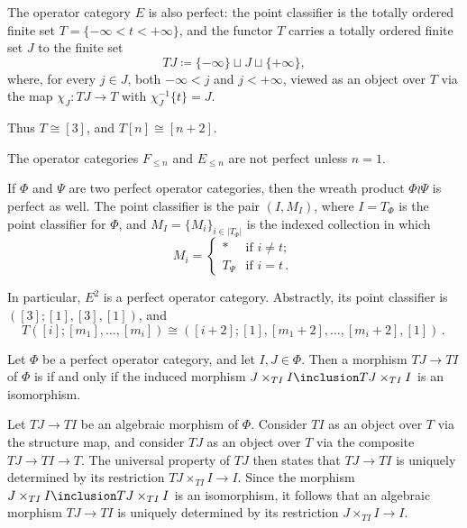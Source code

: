 \begin{eg}
	The operator category $ E $ is also perfect:
	the point classifier is the totally ordered finite set
	$ T = \{ -\infty < t < +\infty \} $,
	and the functor $ T $ carries a totally ordered finite set $ J $
	to the finite set
	\[ TJ \coloneq \{ -\infty \} \sqcup J \sqcup \{ +\infty \} \comma \]
	where, for every $ j \in J $, both $ -\infty < j $ and $ j < +\infty $,
	viewed as an object over $ T $ via the map
	$ \chi_J \colon TJ \to T $ with $ \chi_J^{-1}\{t\} = J $.

	Thus $ T \cong [3] $, and
	$ T[n] \cong [n+2] $.
\end{eg}

\begin{eg}
	The operator categories $ F_{\leq n} $ and $ E_{\leq n} $ are
	not perfect unless $ n = 1 $.
\end{eg}

\begin{eg}
	If $ \Phi $ and $ \Psi $ are two perfect operator categories,
	then the wreath product $ \Phi \wr \Psi $ is perfect as well.
	The point classifier is the pair $ (I, M_I) $, where
	$ I = T_{\Phi} $ is the point classifier for $ \Phi $, and
	$ M_I = \{M_i\}_{i \in |T_{\Phi}|} $ is the indexed collection in which
	\[
		M_i = \begin{cases}
			\ast & \text{if } i \neq t \semicolon \\
			T_{\Psi} & \text{if } i = t \period
		\end{cases}
	\]
\end{eg}

\begin{eg}
	In particular, $ E^2 $ is a perfect operator category.
	Abstractly, its point classifier is $ ([3]; [1], [3], [1])$, and
	\[ T([i]; [m_1], \dots, [m_i]) \cong ([i+2]; [1], [m_1+2], \dots, [m_i+2], [1]) \period \]
\end{eg}

\begin{definition}
	Let $ \Phi $ be a perfect operator category, and
	let $ I, J \in \Phi $.
	Then a morphism $ TJ \to TI $ of $ \Phi $
	is  if and only if 
	the induced morphism $ J \times_{TI} I \inclusion TJ \times_{TI} I $
	is an isomorphism.
\end{definition}

\begin{nul}
	Let $ TJ \to TI $ be an algebraic morphism of $ \Phi $.
	Consider $ TI $ as an object over $ T $ via
	the structure map, and
	consider $ TJ $ as an object over $ T $ via
	the composite $ TJ \to TI \to T $.
	The universal property of $ TJ $ then states that
	$ TJ \to TI $ is uniquely determined by its restriction
	$ TJ \times_{TI} I \to I $.
	Since the morphism $ J \times_{TI} I \inclusion TJ \times_{TI} I $
	is an isomorphism, it follows that 
	an algebraic morphism $ TJ \to TI $ is uniquely determined by its restriction
	$ J \times_{TI} I \to I $.
\end{nul}

